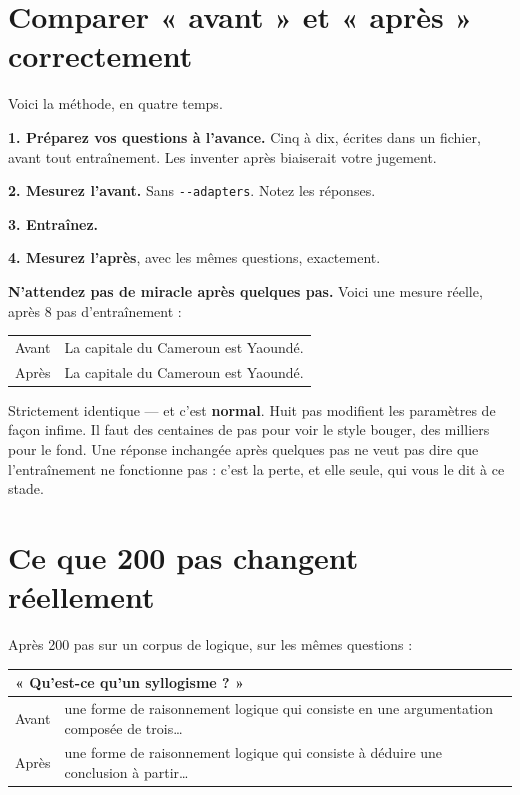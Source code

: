 \section{Comparer « avant » et « après » correctement}

Voici la méthode, en quatre temps.

\textbf{1. Préparez vos questions à l'avance.} Cinq à dix, écrites dans un
fichier, avant tout entraînement. Les inventer après biaiserait votre jugement.

\textbf{2. Mesurez l'avant.} Sans \texttt{-{}-adapters}. Notez les réponses.

\textbf{3. Entraînez.}

\textbf{4. Mesurez l'après}, avec les mêmes questions, exactement.

\begin{nkpiege}
\textbf{N'attendez pas de miracle après quelques pas.} Voici une mesure réelle,
après 8 pas d'entraînement :

\begin{center}
\begin{tabular}{lp{7.6cm}}
Avant & La capitale du Cameroun est Yaoundé. \\
Après & La capitale du Cameroun est Yaoundé. \\
\end{tabular}
\end{center}

Strictement identique — et c'est \textbf{normal}. Huit pas modifient les
paramètres de façon infime. Il faut des centaines de pas pour voir le style
bouger, des milliers pour le fond. Une réponse inchangée après quelques pas ne
veut pas dire que l'entraînement ne fonctionne pas : c'est la perte, et elle
seule, qui vous le dit à ce stade.
\end{nkpiege}

\section{Ce que 200 pas changent réellement}

Après 200 pas sur un corpus de logique, sur les mêmes questions :

\begin{center}
\begin{tabular}{p{2.1cm}p{11.6cm}}
\toprule
\multicolumn{2}{l}{\textbf{« Qu'est-ce qu'un syllogisme ? »}} \\
\midrule
Avant & une forme de raisonnement logique qui consiste en une argumentation
        composée de trois… \\
Après & une forme de raisonnement logique qui consiste à déduire une conclusion
        à partir… \\
\bottomrule
\end{tabular}
\end{center}

